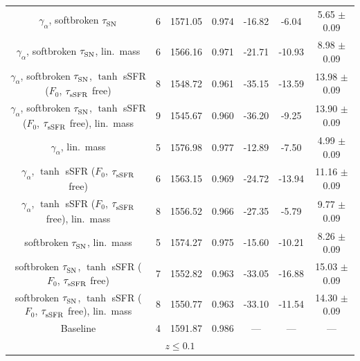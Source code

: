 \begin{longtable}{c c c c c c c}
    \hline
    $\gamma_\alpha^{}$, softbroken $\tau_{\rm SN}^{}$ & 6 & 1571.05 & 0.974 & \cellcolor{aicgreen}-16.82 & \cellcolor{aiclightgreen}-6.04 & \cellcolor{aicgreen}5.65 $\pm$ 0.09 \\
    $\gamma_\alpha^{}$, softbroken $\tau_{\rm SN}^{}$, lin.\ mass & 6 & 1566.16 & 0.971 & \cellcolor{aicgreen}-21.71 & \cellcolor{aicgreen}-10.93 & \cellcolor{aicgreen}8.98 $\pm$ 0.09 \\
    $\gamma_\alpha^{}$, softbroken $\tau_{\rm SN}^{}$, $\tanh$ sSFR ($F_0$, $\tau_{\rm sSFR}^{}$ free) & 8 & 1548.72 & 0.961 & \cellcolor{aicgreen}-35.15 & \cellcolor{aicgreen}-13.59 & \cellcolor{aicgreen}13.98 $\pm$ 0.09 \\
    $\gamma_\alpha^{}$, softbroken $\tau_{\rm SN}^{}$, $\tanh$ sSFR ($F_0$, $\tau_{\rm sSFR}^{}$ free), lin.\ mass & 9 & 1545.67 & 0.960 & \cellcolor{aicgreen}-36.20 & \cellcolor{aiclightgreen}-9.25 & \cellcolor{aicgreen}13.90 $\pm$ 0.09 \\
    $\gamma_\alpha^{}$, lin.\ mass & 5 & 1576.98 & 0.977 & \cellcolor{aicgreen}-12.89 & \cellcolor{aiclightgreen}-7.50 & \cellcolor{aiclightgreen}4.99 $\pm$ 0.09 \\
    $\gamma_\alpha^{}$, $\tanh$ sSFR ($F_0$, $\tau_{\rm sSFR}^{}$ free) & 6 & 1563.15 & 0.969 & \cellcolor{aicgreen}-24.72 & \cellcolor{aicgreen}-13.94 & \cellcolor{aicgreen}11.16 $\pm$ 0.09 \\
    $\gamma_\alpha^{}$, $\tanh$ sSFR ($F_0$, $\tau_{\rm sSFR}^{}$ free), lin.\ mass & 8 & 1556.52 & 0.966 & \cellcolor{aicgreen}-27.35 & \cellcolor{aicyellow}-5.79 & \cellcolor{aicgreen}9.77 $\pm$ 0.09 \\
    softbroken $\tau_{\rm SN}^{}$, lin.\ mass & 5 & 1574.27 & 0.975 & \cellcolor{aicgreen}-15.60 & \cellcolor{aicgreen}-10.21 & \cellcolor{aicgreen}8.26 $\pm$ 0.09 \\
    softbroken $\tau_{\rm SN}^{}$, $\tanh$ sSFR ($F_0$, $\tau_{\rm sSFR}^{}$ free) & 7 & 1552.82 & 0.963 & \cellcolor{aicgreen}-33.05 & \cellcolor{aicgreen}-16.88 & \cellcolor{aicgreen}15.03 $\pm$ 0.09 \\
    softbroken $\tau_{\rm SN}^{}$, $\tanh$ sSFR ($F_0$, $\tau_{\rm sSFR}^{}$ free), lin.\ mass & 8 & 1550.77 & 0.963 & \cellcolor{aicgreen}-33.10 & \cellcolor{aicgreen}-11.54 & \cellcolor{aicgreen}14.30 $\pm$ 0.09 \\
    Baseline & 4 & 1591.87 & 0.986 & --- & --- & --- \\
    \hline
    \multicolumn{7}{c}{\textbf{$z \leq 0.1$}} \\
    \hline

\end{longtable}
